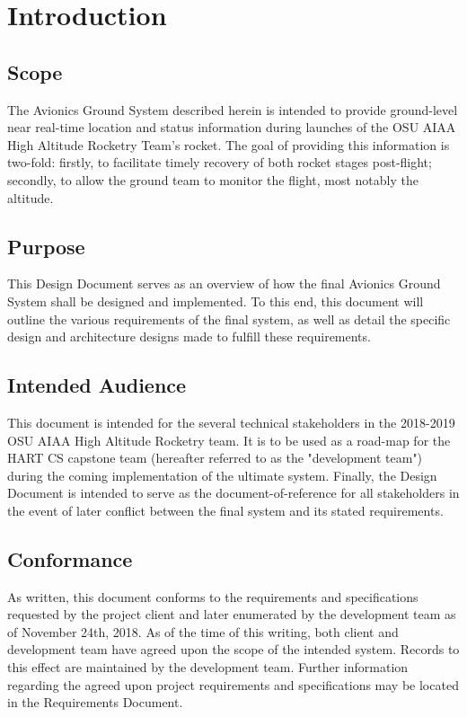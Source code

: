 \documentclass[journal,10pt,onecolumn,compsoc]{IEEEtran}
\begin{document}
\setlength{\parskip}{\baselineskip} 
\section{Introduction}

	\subsection{Scope}
		\noindent The Avionics Ground System described herein is intended to provide ground-level near real-time location and status information during launches of the OSU AIAA High Altitude Rocketry Team's rocket.
		The goal of providing this information is two-fold: firstly, to facilitate timely recovery of both rocket stages post-flight; secondly, to allow the ground team to monitor the flight, most notably the altitude.

	\subsection{Purpose}
		\noindent This Design Document serves as an overview of how the final Avionics Ground System shall be designed and implemented.
		To this end, this document will outline the various requirements of the final system, as well as detail the specific design and architecture designs made to fulfill these requirements.

	\subsection{Intended Audience}
		\noindent This document is intended for the several technical stakeholders in the 2018-2019 OSU AIAA High Altitude Rocketry team.
		It is to be used as a road-map for the HART CS capstone team (hereafter referred to as the "development team") during the coming implementation of the ultimate system.
		Finally, the Design Document is intended to serve as the document-of-reference for all stakeholders in the event of later conflict between the final system and its stated requirements.

	\subsection{Conformance}
		\noindent As written, this document conforms to the requirements and specifications requested by the project client and later enumerated by the development team as of November 24th, 2018.
		As of the time of this writing, both client and development team have agreed upon the scope of the intended system.
		Records to this effect are maintained by the development team.
		Further information regarding the agreed upon project requirements and specifications may be located in the Requirements Document.
\end{document}
